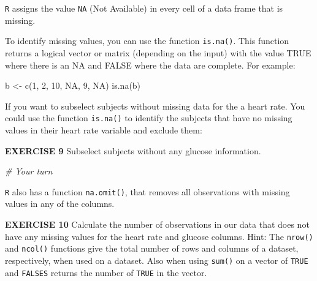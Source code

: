\documentclass[
]{article}
\newenvironment{Shaded}{\begin{snugshade}}{\end{snugshade}}
\newcommand{\CommentTok}[1]{\textcolor[rgb]{0.56,0.35,0.01}{\textit{#1}}}
\newcommand{\ConstantTok}[1]{\textcolor[rgb]{0.00,0.00,0.00}{#1}}
\newcommand{\DecValTok}[1]{\textcolor[rgb]{0.00,0.00,0.81}{#1}}
\newcommand{\FunctionTok}[1]{\textcolor[rgb]{0.00,0.00,0.00}{#1}}
\newcommand{\NormalTok}[1]{#1}
\newcommand{\OtherTok}[1]{\textcolor[rgb]{0.56,0.35,0.01}{#1}}
\newcommand{\SpecialCharTok}[1]{\textcolor[rgb]{0.00,0.00,0.00}{#1}}
\begin{document}
\texttt{R} assigns the value \texttt{NA} (Not Available) in every cell
of a data frame that is missing.

To identify missing values, you can use the function \texttt{is.na()}.
This function returns a logical vector or matrix (depending on the
input) with the value TRUE where there is an NA and FALSE where the data
are complete. For example:

\begin{Shaded}
\begin{Highlighting}[]
\NormalTok{b }\OtherTok{\textless{}{-}} \FunctionTok{c}\NormalTok{(}\DecValTok{1}\NormalTok{, }\DecValTok{2}\NormalTok{, }\DecValTok{10}\NormalTok{, }\ConstantTok{NA}\NormalTok{, }\DecValTok{9}\NormalTok{, }\ConstantTok{NA}\NormalTok{)}
\FunctionTok{is.na}\NormalTok{(b)}
\end{Highlighting}
\end{Shaded}

If you want to subselect subjects without missing data for the a heart
rate. You could use the function \texttt{is.na()} to identify the
subjects that have no missing values in their heart rate variable and
exclude them:

\begin{Shaded}
\end{Shaded}

\textbf{EXERCISE 9} Subselect subjects without any glucose information.

\begin{Shaded}
\begin{Highlighting}[]
\CommentTok{\# Your turn}
\end{Highlighting}
\end{Shaded}

\texttt{R} also has a function \texttt{na.omit()}, that removes all
observations with missing values in any of the columns.

\textbf{EXERCISE 10} Calculate the number of observations in our data
that does not have any missing values for the heart rate and glucose
columns. Hint: The \texttt{nrow()} and \texttt{ncol()} functions give
the total number of rows and columns of a dataset, respectively, when
used on a dataset. Also when using \texttt{sum()} on a vector of
\texttt{TRUE} and \texttt{FALSES} returns the number of \texttt{TRUE} in
the vector.
\end{document}
